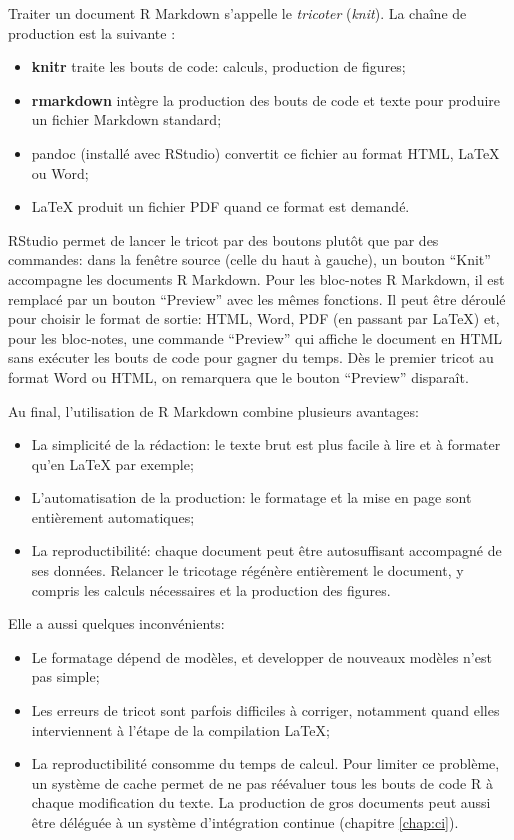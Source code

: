 \documentclass[
  12pt,
  french,
  a4paper,
  extrafontsizes,onecolumn,openright
  ]{memoir}
\providecommand{\tightlist}{%
  \setlength{\itemsep}{0pt}\setlength{\parskip}{0pt}}
\newlength{\rf}
\begin{document}
Traiter un document R Markdown s'appelle le \emph{tricoter} (\emph{knit}).
La chaîne de production est la suivante :

\begin{itemize}
\tightlist
\item
  \textbf{knitr} traite les bouts de code: calculs, production de figures;
\item
  \textbf{rmarkdown} intègre la production des bouts de code et texte pour produire un fichier Markdown standard;
\item
  pandoc (installé avec RStudio) convertit ce fichier au format HTML, LaTeX ou Word;
\item
  LaTeX produit un fichier PDF quand ce format est demandé.
\end{itemize}

RStudio permet de lancer le tricot par des boutons plutôt que par des commandes: dans la fenêtre source (celle du haut à gauche), un bouton \enquote{Knit} accompagne les documents R Markdown.
Pour les bloc-notes R Markdown, il est remplacé par un bouton \enquote{Preview} avec les mêmes fonctions.
Il peut être déroulé pour choisir le format de sortie: HTML, Word, PDF (en passant par LaTeX) et, pour les bloc-notes, une commande \enquote{Preview} qui affiche le document en HTML sans exécuter les bouts de code pour gagner du temps.
Dès le premier tricot au format Word ou HTML, on remarquera que le bouton \enquote{Preview} disparaît.

Au final, l'utilisation de R Markdown combine plusieurs avantages:

\begin{itemize}
\tightlist
\item
  La simplicité de la rédaction: le texte brut est plus facile à lire et à formater qu'en LaTeX par exemple;
\item
  L'automatisation de la production: le formatage et la mise en page sont entièrement automatiques;
\item
  La reproductibilité: chaque document peut être autosuffisant accompagné de ses données. Relancer le tricotage régénère entièrement le document, y compris les calculs nécessaires et la production des figures.
\end{itemize}

Elle a aussi quelques inconvénients:

\begin{itemize}
\tightlist
\item
  Le formatage dépend de modèles, et developper de nouveaux modèles n'est pas simple;
\item
  Les erreurs de tricot sont parfois difficiles à corriger, notamment quand elles interviennent à l'étape de la compilation LaTeX;
\item
  La reproductibilité consomme du temps de calcul. Pour limiter ce problème, un système de cache permet de ne pas réévaluer tous les bouts de code R à chaque modification du texte. La production de gros documents peut aussi être déléguée à un système d'intégration continue (chapitre \ref{chap:ci}).
\end{itemize}
\end{document}
